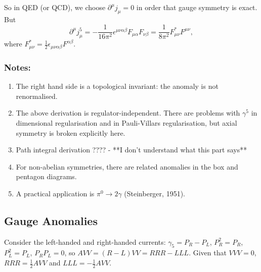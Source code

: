 So in QED (or QCD), we choose $\partial^\mu j_\mu = 0$ in order that gauge symmetry is exact. But 
\begin{equation}
\partial^\mu j_\mu^5 = - \frac{1}{16 \pi^2} \epsilon^{\mu \nu \alpha \beta} F_{\mu \alpha} F_{\nu \beta} = \frac{1}{8 \pi^2} F_{\mu \nu}^* F^{\mu \nu},
\end{equation}
where $F_{\mu \nu}^* = \frac{1}{2} \epsilon_{\mu \nu \alpha \beta} F^{\alpha \beta}$.
\subsubsection{Notes:}
\begin{enumerate}
\item The right hand side is a topological invariant: the anomaly is not renormalised.
\item The above derivation is regulator-independent. There are problems with $\gamma^5$ in dimensional regularisation and in Pauli-Villars regularisation, but axial symmetry is broken explicitly here.
\item Path integral derivation ???? - **I don't understand what this part says**
\item For non-abelian symmetries, there are related anomalies in the box and pentagon diagrams.
\item A practical application is $\pi^0 \to 2\gamma$ (Steinberger, 1951).
\end{enumerate}
%
\subsection{Gauge Anomalies}
%
Consider the left-handed and right-handed currents: $\gamma_5 = P_R - P_L$, $P_R^2=P_R$, $P_L^2=P_L$, $P_RP_L=0$, so $AVV = (R-L)VV = RRR - LLL$. Given that $VVV=0$, $RRR = \frac{1}{2}AVV$ and $LLL = -\frac{1}{2}AVV$.

